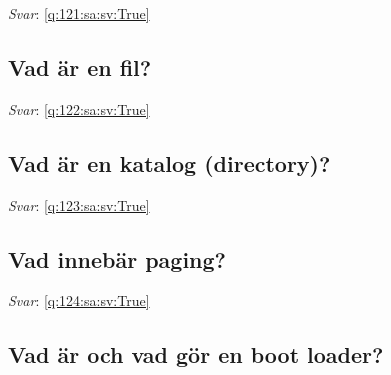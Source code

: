 \documentclass[a4paper,11pt,oneside]{article}
\begin{document}
\begin{sloppypar}
\label{q:121:sa:sv:False}

\vspace{2cm}

\noindent\makebox[\textwidth]{\hrulefill}

\vspace{1cm}

\textit{Svar}: \autoref{q:121:sa:sv:True}



\subsection{Vad \"ar en fil?}

\label{q:122:sa:sv:False}

\vspace{2cm}

\noindent\makebox[\textwidth]{\hrulefill}

\vspace{1cm}

\textit{Svar}: \autoref{q:122:sa:sv:True}



\subsection{Vad \"ar en katalog (directory)?}

\label{q:123:sa:sv:False}

\vspace{2cm}

\noindent\makebox[\textwidth]{\hrulefill}

\vspace{1cm}

\textit{Svar}: \autoref{q:123:sa:sv:True}



\subsection{Vad inneb\"ar paging?}

\label{q:124:sa:sv:False}

\vspace{2cm}

\noindent\makebox[\textwidth]{\hrulefill}

\vspace{1cm}

\textit{Svar}: \autoref{q:124:sa:sv:True}



\subsection{Vad \"ar och vad g\"or en boot loader?}


\end{sloppypar}
\end{document}
